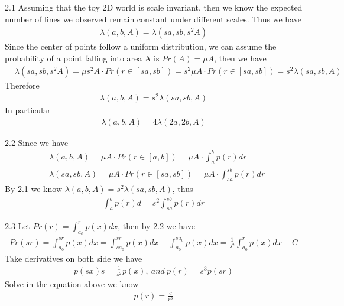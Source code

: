 \documentclass[12pt]{article}
\newenvironment{problem}[2][Problem]{\begin{trivlist}
\item[\hskip \labelsep {\bfseries #1}\hskip \labelsep {\bfseries #2}]}{\end{trivlist}}
\begin{document}
\begin{problem}{2.}
\item{2.1}
Assuming that the toy 2D world is scale invariant, then we know the expected number of lines we observed remain constant under different scales. Thus we have
\begin{align*}
	\lambda (a, b, A) = \lambda(sa, sb, s^2 A)
\end{align*}
Since the center of points follow a uniform distribution, we can assume the probability of a point falling into area A is $Pr(A) = \mu A$, then we have 
\begin{align*}
	&\lambda(sa, sb, s^2 A) = \mu s^2 A \cdot Pr(r \in [sa, sb]) = s^2 \mu A \cdot Pr(r \in [sa, sb]) = s^2 \lambda(sa, sb, A)
\end{align*}
Therefore
\begin{align*}
	\lambda (a,b,A) = s^2 \lambda(sa, sb, A)
\end{align*}
In particular
\begin{align*}
	\lambda (a,b,A) = 4 \lambda(2a, 2b, A)
\end{align*}
\item{2.2}
Since we have
\begin{align*}
	&\lambda (a,b,A) = \mu A \cdot Pr(r \in [a, b]) = \mu A \cdot \int_{a}^b p(r) dr\\
	&\lambda (sa,sb,A) = \mu A \cdot Pr(r \in [sa, sb]) = \mu A \cdot \int_{sa}^{sb} p(r) dr
\end{align*}
By 2.1 we know $\lambda(a, b, A) = s^2 \lambda(sa, sb, A)$, thus
\begin{align*}
	\int_{a}^b p(r) d = s^2 \int_{sa}^{sb} p(r) dr
\end{align*}
\item{2.3}
Let $Pr(r) = \int_{a_0}^{r} p(x) dx$, then by 2.2 we have
\begin{align*}
	Pr(sr) = \int_{a_0}^{sr} p(x) dx = \int_{sa_0}^{sr} p(x) dx - \int_{a_0}^{sa_0} p(x) dx = \frac{1}{s^2} \int_{a_0}^{r} p(x) dx - C
\end{align*}
Take derivatives on both side we have
\begin{align*}
	p(sx) s = \frac{1}{s^2} p(x),\ and\  p(r) = s^3p(sr)
\end{align*}
Solve in the equation above we know
\begin{align*}
	p(r) = \frac{c}{r^3}
\end{align*}
\end{problem}
\end{document}
